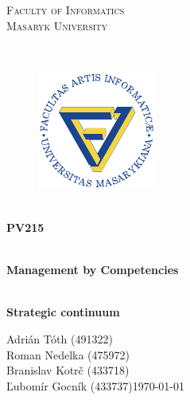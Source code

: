 \documentclass[11pt,a4paper]{article}
\begin{document}
\begin{titlepage}

    \begin{center}
        \vfill {%
            \Huge{%
                \textsc{%
                    Faculty of Informatics\\[3mm]%
                    Masaryk University%
                }%
            }%
        }%

        \hfill\\[15mm]

        \begin{figure}[!h]
            \centering
            \includegraphics[scale=3]{muni-fi-logo.pdf}
        \end{figure}

        \hfill\\[10mm]

        \Huge{
            \textbf{
                PV215
            }
        }

        \hfill\\[-10mm]

        \huge{
            \textbf{
                Management by Competencies
            }
        }

        \hfill\\[10mm]

        \LARGE{
            \textbf{
                Strategic continuum
            }
        }
        \vfill

    \end{center}

        \Large{
            Adrián Tóth (491322)\\
            Roman Nedelka (475972)\\
            Branislav Kotrč (433718)\\
            Ľubomír Gocník (433737)\hfill \today
        }

\end{titlepage}

\setlength{\parskip}{0pt}
    \hypersetup{hidelinks}\tableofcontents
\setlength{\parskip}{0pt}
\end{document}
